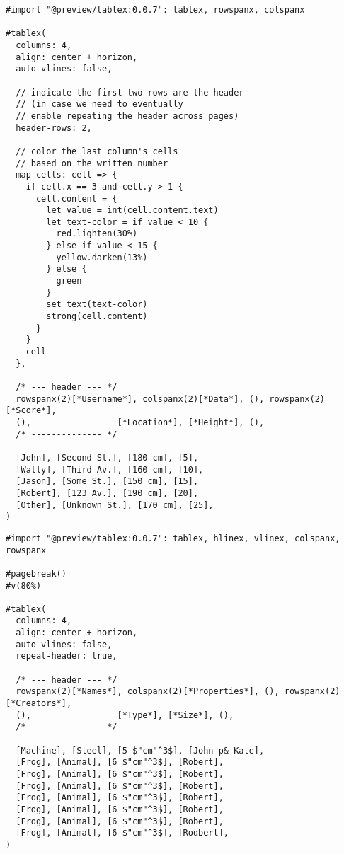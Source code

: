 \begin{verbatim}
#import "@preview/tablex:0.0.7": tablex, rowspanx, colspanx

#tablex(
  columns: 4,
  align: center + horizon,
  auto-vlines: false,

  // indicate the first two rows are the header
  // (in case we need to eventually
  // enable repeating the header across pages)
  header-rows: 2,

  // color the last column's cells
  // based on the written number
  map-cells: cell => {
    if cell.x == 3 and cell.y > 1 {
      cell.content = {
        let value = int(cell.content.text)
        let text-color = if value < 10 {
          red.lighten(30%)
        } else if value < 15 {
          yellow.darken(13%)
        } else {
          green
        }
        set text(text-color)
        strong(cell.content)
      }
    }
    cell
  },

  /* --- header --- */
  rowspanx(2)[*Username*], colspanx(2)[*Data*], (), rowspanx(2)[*Score*],
  (),                 [*Location*], [*Height*], (),
  /* -------------- */

  [John], [Second St.], [180 cm], [5],
  [Wally], [Third Av.], [160 cm], [10],
  [Jason], [Some St.], [150 cm], [15],
  [Robert], [123 Av.], [190 cm], [20],
  [Other], [Unknown St.], [170 cm], [25],
)
\end{verbatim}

\pandocbounded{}

\begin{verbatim}
#import "@preview/tablex:0.0.7": tablex, hlinex, vlinex, colspanx, rowspanx

#pagebreak()
#v(80%)

#tablex(
  columns: 4,
  align: center + horizon,
  auto-vlines: false,
  repeat-header: true,

  /* --- header --- */
  rowspanx(2)[*Names*], colspanx(2)[*Properties*], (), rowspanx(2)[*Creators*],
  (),                 [*Type*], [*Size*], (),
  /* -------------- */

  [Machine], [Steel], [5 $"cm"^3$], [John p& Kate],
  [Frog], [Animal], [6 $"cm"^3$], [Robert],
  [Frog], [Animal], [6 $"cm"^3$], [Robert],
  [Frog], [Animal], [6 $"cm"^3$], [Robert],
  [Frog], [Animal], [6 $"cm"^3$], [Robert],
  [Frog], [Animal], [6 $"cm"^3$], [Robert],
  [Frog], [Animal], [6 $"cm"^3$], [Robert],
  [Frog], [Animal], [6 $"cm"^3$], [Rodbert],
)
\end{verbatim}

